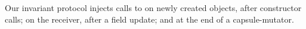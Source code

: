 Our invariant protocol injects calls to \Q@invariant@ on newly created objects, after constructor calls; on the receiver, after a field update; and \Q@this@ at the end of a capsule-mutator.












